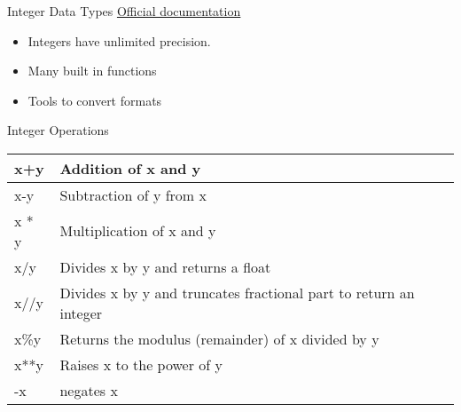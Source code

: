 % 
% 
% 
\begin{Slide}{Integer Data Types}
  \underline{\href{https://docs.python.org/3/library/stdtypes.html\#numeric-types-int-float-complex}{Official documentation}}\\
  \begin{itemize}
    \item Integers have unlimited precision.
    \item Many built in functions
    \item Tools to convert formats
    \end{itemize}
\end{Slide}


% 
% 
% 
\begin{Slide}{Integer Operations}

  \begin{table}[h]
    \begin{tabular}{|l|p{8cm}|} \hline
      x+y    & Addition of x and y \\ \hline
      x-y    & Subtraction of y from x \\ \hline
      x * y  & Multiplication of x and y \\ \hline 
      x/y    & Divides x by y and returns a float \\ \hline
      x//y   & Divides x by y and truncates fractional part to return an integer  \\ \hline
      x\%y   & Returns the modulus (remainder) of x divided by y \\ \hline
      x**y   & Raises x to the power of y \\ \hline
      -x     & negates x  \\ \hline
    \end{tabular}
  \end{table}

\end{Slide}

